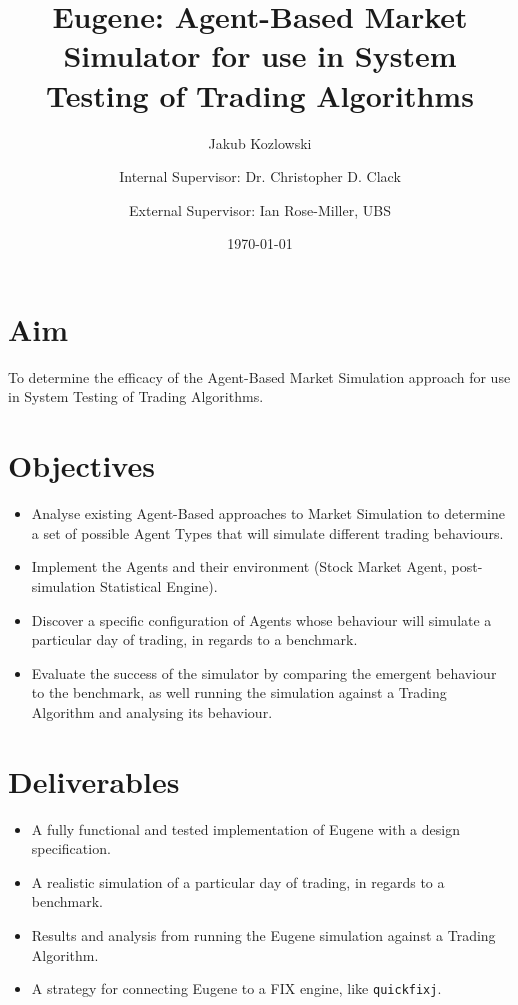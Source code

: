 \documentclass[10pt,a4paper]{article}
\title{Eugene: Agent-Based Market Simulator for use in System Testing of Trading Algorithms}
\author{Jakub Kozlowski \and Internal Supervisor: Dr. Christopher D. Clack \and External Supervisor: Ian Rose-Miller, UBS}
\date{\today}
\begin{document}
\maketitle

\section*{Aim}
To determine the efficacy of the Agent-Based Market Simulation approach for use in System Testing of Trading Algorithms.

\section*{Objectives}
\begin{itemize}
\item Analyse existing Agent-Based approaches to Market Simulation to determine a set of possible Agent Types that will simulate different trading behaviours.
\item Implement the Agents and their environment (Stock Market Agent, post-simulation Statistical Engine).
\item Discover a specific configuration of Agents whose behaviour will simulate a particular day of trading, in regards to a benchmark.
\item Evaluate the success of the simulator by comparing the emergent behaviour to the benchmark, as well running the simulation against a Trading Algorithm and analysing its behaviour.
\end{itemize}

\section*{Deliverables}
\begin{itemize}
\item A fully functional and tested implementation of Eugene with a design specification.
\item A realistic simulation of a particular day of trading, in regards to a benchmark.
\item Results and analysis from running the Eugene simulation against a Trading Algorithm.
\item A strategy for connecting Eugene to a FIX engine, like \texttt{quickfixj}.
\end{itemize}
\end{document}
